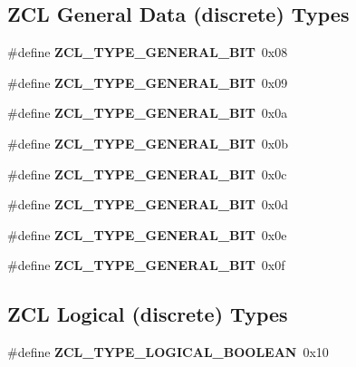 \subsection*{Z\+CL General Data (discrete) Types}
\begin{DoxyCompactItemize}
\item 
\mbox{\label{group__zcl__types_gacde7d69b6b6930a192a03dd95548a402}} 
\#define {\bfseries Z\+C\+L\+\_\+\+T\+Y\+P\+E\+\_\+\+G\+E\+N\+E\+R\+A\+L\+\_\+B\+IT}~0x08
\item 
\mbox{\label{group__zcl__types_ga9eba3bb33af0080097578430a8b49fc3}} 
\#define {\bfseries Z\+C\+L\+\_\+\+T\+Y\+P\+E\+\_\+\+G\+E\+N\+E\+R\+A\+L\+\_\+B\+IT}~0x09
\item 
\mbox{\label{group__zcl__types_gae5e7ea67aa04595d9d73da5f64f71a52}} 
\#define {\bfseries Z\+C\+L\+\_\+\+T\+Y\+P\+E\+\_\+\+G\+E\+N\+E\+R\+A\+L\+\_\+B\+IT}~0x0a
\item 
\mbox{\label{group__zcl__types_ga63038284c953826853ba8747a82baa91}} 
\#define {\bfseries Z\+C\+L\+\_\+\+T\+Y\+P\+E\+\_\+\+G\+E\+N\+E\+R\+A\+L\+\_\+B\+IT}~0x0b
\item 
\mbox{\label{group__zcl__types_gab9b38a5f9e53db715ce6da47fee7982e}} 
\#define {\bfseries Z\+C\+L\+\_\+\+T\+Y\+P\+E\+\_\+\+G\+E\+N\+E\+R\+A\+L\+\_\+B\+IT}~0x0c
\item 
\mbox{\label{group__zcl__types_ga11e0d3943fb5db53a13a8612a9ac99a8}} 
\#define {\bfseries Z\+C\+L\+\_\+\+T\+Y\+P\+E\+\_\+\+G\+E\+N\+E\+R\+A\+L\+\_\+B\+IT}~0x0d
\item 
\mbox{\label{group__zcl__types_ga320d8cfb4b5674d25770ae6e7181b0fb}} 
\#define {\bfseries Z\+C\+L\+\_\+\+T\+Y\+P\+E\+\_\+\+G\+E\+N\+E\+R\+A\+L\+\_\+B\+IT}~0x0e
\item 
\mbox{\label{group__zcl__types_ga09599455943165aa8436142254c798da}} 
\#define {\bfseries Z\+C\+L\+\_\+\+T\+Y\+P\+E\+\_\+\+G\+E\+N\+E\+R\+A\+L\+\_\+B\+IT}~0x0f
\end{DoxyCompactItemize}
\subsection*{Z\+CL Logical (discrete) Types}
\begin{DoxyCompactItemize}
\item 
\mbox{\label{group__zcl__types_gaf53d04b9e7617803f30ec7cea3539056}} 
\#define {\bfseries Z\+C\+L\+\_\+\+T\+Y\+P\+E\+\_\+\+L\+O\+G\+I\+C\+A\+L\+\_\+\+B\+O\+O\+L\+E\+AN}~0x10
\end{DoxyCompactItemize}
